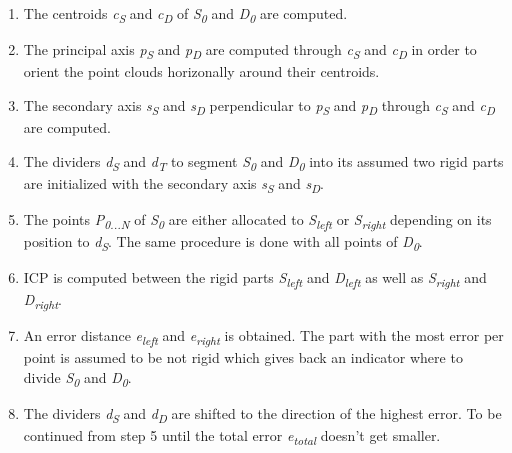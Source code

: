 \begin{enumerate}
	\item The centroids \textit{c\textsubscript{S}} and \textit{c\textsubscript{D}} of \textit{S\textsubscript{0}} and \textit{D\textsubscript{0}} are computed.
	
	\item The principal axis \textit{p\textsubscript{S}} and \textit{p\textsubscript{D}}  are computed through \textit{c\textsubscript{S}} and \textit{c\textsubscript{D}} in order to orient the point clouds horizonally around their centroids.
	
	\item The secondary axis \textit{s\textsubscript{S}} and \textit{s\textsubscript{D}} perpendicular to \textit{p\textsubscript{S}} and \textit{p\textsubscript{D}} through \textit{c\textsubscript{S}} and \textit{c\textsubscript{D}} are computed.
	
	\item The dividers \textit{d\textsubscript{S}} and \textit{d\textsubscript{T}} to segment \textit{S\textsubscript{0}} and \textit{D\textsubscript{0}} into its assumed two rigid parts are initialized with the secondary axis \textit{s\textsubscript{S}} and \textit{s\textsubscript{D}}.
	
	\item The points \textit{P\textsubscript{0...N}} of \textit{S\textsubscript{0}}  are either allocated to \textit{S\textsubscript{left}} or \textit{S\textsubscript{right}} depending on its position to \textit{d\textsubscript{S}}. The same procedure is done with all points of \textit{D\textsubscript{0}}.
	
	\item ICP is computed between the rigid parts \textit{S\textsubscript{left}} and \textit{D\textsubscript{left}} as well as \textit{S\textsubscript{right}} and \textit{D\textsubscript{right}}.
	
	\item An error distance \textit{e\textsubscript{left}} and \textit{e\textsubscript{right}} is obtained. The part with the most error per point is assumed to be not rigid which gives back an indicator where to divide \textit{S\textsubscript{0}} and \textit{D\textsubscript{0}}.
	
	\item The dividers \textit{d\textsubscript{S}} and \textit{d\textsubscript{D}} are shifted to the direction of the highest error. To be continued from step 5 until the total error \textit{e\textsubscript{total}} doesn't get smaller.
\end{enumerate}

